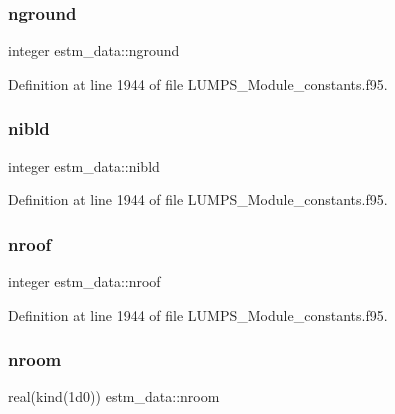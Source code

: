 \mbox{\label{namespaceestm__data_aa85aac6c0317e29416f627b48f11fb51}} 
\subsubsection{\texorpdfstring{nground}{nground}}
{\footnotesize\ttfamily integer estm\+\_\+data\+::nground}



Definition at line 1944 of file L\+U\+M\+P\+S\+\_\+\+Module\+\_\+constants.\+f95.

\mbox{\label{namespaceestm__data_a2c79bef2a37b73c20e9e9531cc84f2a2}} 
\subsubsection{\texorpdfstring{nibld}{nibld}}
{\footnotesize\ttfamily integer estm\+\_\+data\+::nibld}



Definition at line 1944 of file L\+U\+M\+P\+S\+\_\+\+Module\+\_\+constants.\+f95.

\mbox{\label{namespaceestm__data_a1510b42e476421a5d5e5bf62fcf78173}} 
\subsubsection{\texorpdfstring{nroof}{nroof}}
{\footnotesize\ttfamily integer estm\+\_\+data\+::nroof}



Definition at line 1944 of file L\+U\+M\+P\+S\+\_\+\+Module\+\_\+constants.\+f95.

\mbox{\label{namespaceestm__data_a484d32bf82e9fbf6e99d5a867b09ebdf}} 
\subsubsection{\texorpdfstring{nroom}{nroom}}
{\footnotesize\ttfamily real(kind(1d0)) estm\+\_\+data\+::nroom}




